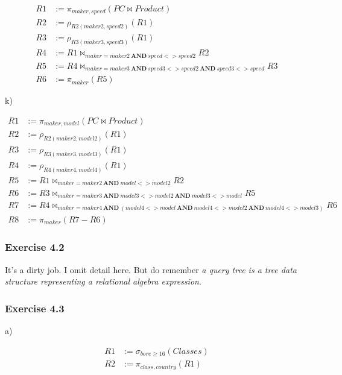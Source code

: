 \documentclass[../../main.tex]{subfiles}
\begin{document}
\begin{align*}
  R1 &:= \pi_{maker, speed}(PC \bowtie Product) \\
  R2 &:= \rho_{R2(maker2, speed2)}(R1) \\
  R3 &:= \rho_{R3(maker3, speed3)}(R1) \\
  R4 &:= R1 \bowtie_{maker = maker2 \ \mathbf{AND} \ speed <> speed2} R2 \\
  R5 &:= R4 \bowtie_{maker = maker3 \ \mathbf{AND} \ speed3 <> speed2
         \ \mathbf{AND} \ speed3 <> speed} R3 \\
  R6 &:= \pi_{maker}(R5)
\end{align*}

k)

\begin{align*}
  R1 &:= \pi_{maker, model}(PC \bowtie Product) \\
  R2 &:= \rho_{R2(maker2, model2)}(R1) \\
  R3 &:= \rho_{R3(maker3, model3)}(R1) \\
  R4 &:= \rho_{R4(maker4, model4)}(R1) \\
  R5 &:= R1 \bowtie_{maker=maker2 \ \mathbf{AND} \ model <> model2} R2 \\
  R6 &:= R3 \bowtie_{maker=maker3 \ \mathbf{AND} \ model3 <> model2
         \ \mathbf{AND} \ model3 <> model}R5 \\
  R7 &:= R4 \bowtie_{maker=maker4 \ \mathbf{AND} \ (model4 <> model \ \mathbf{AND} \
         model4 <> model2 \ \mathbf{AND} \ model4 <> model3)} R6 \\
  R8 &:= \pi_{maker}(R7 - R6)
\end{align*}

\subsubsection*{Exercise 4.2}

It's a dirty job. I omit detail here. But do remember
\emph{a query tree is a tree data structure representing
a relational algebra expression}.

\subsubsection*{Exercise 4.3}

a)

\begin{align*}
  R1 &:= \sigma_{bore \geq 16}(Classes) \\
  R2 &:= \pi_{class,country}(R1)
\end{align*}
\end{document}
